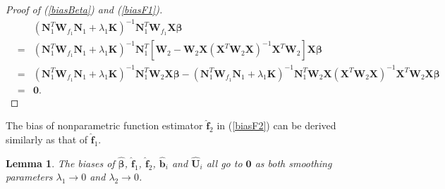 \documentclass[review]{elsarticle}
\newtheorem{lem}[thm]{Lemma}
\begin{document}
\begin{proof} [Proof of (\ref{biasBeta}) and (\ref{biasF1})]
\begin{eqnarray*}
&&(\boldsymbol N_1^T \boldsymbol W_{f_1}  \boldsymbol N_1
  + \lambda_1 \boldsymbol K)^{-1}  \boldsymbol N_1^T \boldsymbol W_{f_1}
  \boldsymbol X \boldsymbol \beta \\
  &=&
(\boldsymbol N_1^T \boldsymbol W_{f_1}  \boldsymbol N_1
  + \lambda_1 \boldsymbol K)^{-1}  \boldsymbol N_1^T
  \left[
\boldsymbol W_2 - \boldsymbol W_2\boldsymbol X(\boldsymbol X^T  \boldsymbol W_2\boldsymbol X)^{-1}  \boldsymbol X^T  \boldsymbol W_2
  \right]
  \boldsymbol X \boldsymbol \beta 
  \\
  &=&
(\boldsymbol N_1^T \boldsymbol W_{f_1}  \boldsymbol N_1
  + \lambda_1 \boldsymbol K)^{-1}  \boldsymbol N_1^T
\boldsymbol W_2
\boldsymbol X \boldsymbol \beta 
 -   (\boldsymbol N_1^T \boldsymbol W_{f_1}  \boldsymbol N_1
  + \lambda_1 \boldsymbol K)^{-1}  \boldsymbol N_1^T
\boldsymbol W_2 \boldsymbol X
(\boldsymbol X^T  \boldsymbol W_2\boldsymbol X)^{-1}  
\boldsymbol X^T  \boldsymbol W_2 \boldsymbol X
\boldsymbol \beta  \\
  &=&   \boldsymbol 0.
\end{eqnarray*}
\end{proof}
\begin{rmk}
The bias of nonparametric function estimator $\bm {\hat f}_2$ in (\ref{biasF2}) can be derived similarly as that of $\bm {\hat f}_1$.
\end{rmk}


%
%
\begin{lem} \label{biasConv}
The biases of $\boldsymbol {\hat \beta}$, $\boldsymbol {\hat f}_1$, $\boldsymbol {\hat f}_2$, $\boldsymbol {\hat b}_i$ and $\boldsymbol {\hat U}_i$ all go to $\boldsymbol 0$ as both smoothing parameters $\lambda_1 \to 0$ and $\lambda_2 \to 0$.
\end{lem}
\end{document}
